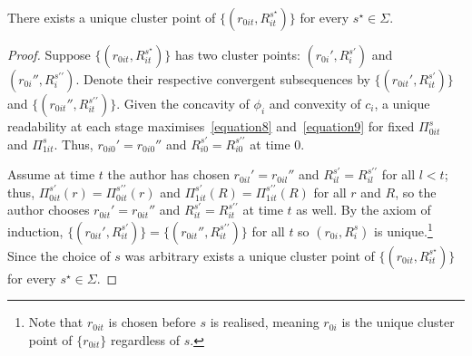 \begin{lemma}\label{Lemma4}
There exists a unique cluster point of $\{(r_{0it},R_{it}^{s^\star})\}$ for every $s^\star\in\Sigma$.
\end{lemma}
\begin{proof}
Suppose $\{(r_{0it},R_{it}^{s^\star})\}$ has two cluster points: $(r_{0i}',R_i^{s\prime})$ and $(r_{0i}'',R_i^{s\prime\prime})$. Denote their respective convergent subsequences by $\{(r_{0it}',R_{it}^{s\prime})\}$ and $\{(r_{0it}'',R_{it}^{s\prime\prime})\}$. Given the concavity of $\phi_i$ and convexity of $c_i$, a unique readability at each stage maximises~\autoref{equation8} and~\autoref{equation9} for fixed $\Pi_{0it}^s$ and $\Pi_{1it}^s$. Thus, $r_{0i0}'=r_{0i0}''$ and $R_{i0}^{s\prime}=R_{i0}^{s\prime\prime}$ at time 0.
				
Assume at time $t$ the author has chosen $r_{0il}'=r_{0il}''$ and $R_{il}^{s\prime}=R_{il}^{s\prime\prime}$ for all $l<t$; thus, $\Pi_{0it}^{s\prime}(r)=\Pi_{0it}^{s\prime\prime}(r)$ and $\Pi_{1it}^{s\prime}(R)=\Pi_{1it}^{s\prime\prime}(R)$ for all $r$ and $R$, so the author chooses $r_{0it}'=r_{0it}''$ and $R_{it}^{s\prime}=R_{it}^{s\prime\prime}$ at time $t$ as well. By the axiom of induction, $\{(r_{0it}',R_{it}^{s\prime})\}=\{(r_{0it}'',R_{it}^{s\prime\prime})\}$ for all $t$ so $(r_{0i}, R_i^s)$ is unique.\footnote{Note that $r_{0it}$ is chosen before $s$ is realised, meaning $r_{0i}$ is the unique cluster point of $\{r_{0it}\}$ regardless of $s$.} Since the choice of $s$ was arbitrary exists a unique cluster point of $\{(r_{0it},R_{it}^{s^\star})\}$ for every $s^\star\in\Sigma$.
\end{proof}

